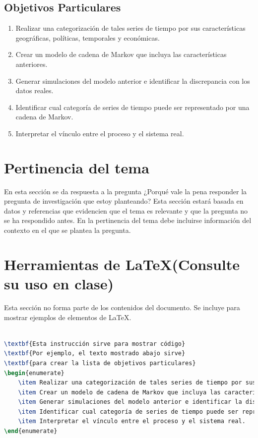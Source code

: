 \documentclass{ceri/sty/rapport}
\begin{document}
\subsection{Objetivos Particulares}
\begin{enumerate}
    \item Realizar una categorización de tales series de tiempo por sus características geográficas, políticas, temporales y económicas.
    \item Crear un modelo de cadena de Markov que incluya las características anteriores.
    \item Generar simulaciones del modelo anterior e identificar la discrepancia con los datos reales.
    \item Identificar cual categoría de series de tiempo puede ser representado por una cadena de Markov.
    \item Interpretar el vínculo entre el proceso y el sistema real.
\end{enumerate}

\section{Pertinencia del tema}

En esta sección se da respuesta a la pregunta ¿Porqué vale la pena responder la pregunta de investigación que estoy planteando? Esta sección estará basada en datos y referencias que evidencien que el tema es relevante y que la pregunta no se ha respondido antes. En la pertinencia del tema debe incluirse información del contexto en el que se plantea la pregunta. 

\section{Herramientas de \LaTeX (Consulte su uso en clase)}
Esta sección no forma parte de los contenidos del documento. Se incluye para mostrar ejemplos de elementos de \LaTeX.

\begin{lstlisting}[language=TeX,numbers=none]

\textbf{Esta instrucción sirve para mostrar código}
\textbf{Por ejemplo, el texto mostrado abajo sirve}
\textbf{para crear la lista de objetivos particulares}
\begin{enumerate}
    \item Realizar una categorización de tales series de tiempo por sus características geográficas, políticas, temporales y económicas.
    \item Crear un modelo de cadena de Markov que incluya las características anteriores.
    \item Generar simulaciones del modelo anterior e identificar la discrepancia con los datos reales.
    \item Identificar cual categoría de series de tiempo puede ser representado por una cadena de Markov.
    \item Interpretar el vínculo entre el proceso y el sistema real.
\end{enumerate}

\end{lstlisting}
\end{document}

